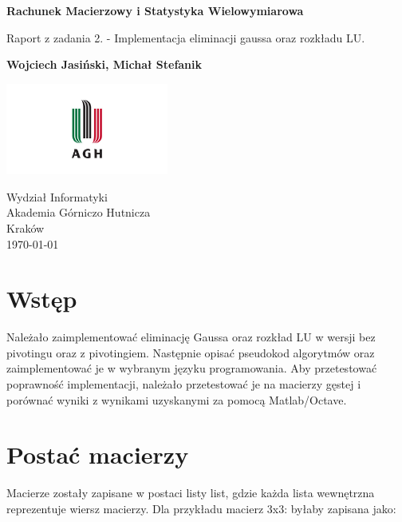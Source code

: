 \documentclass[a4paper]{article}
\begin{document}
\begin{titlepage}
    \begin{center}
        \vspace*{1cm}

        \Huge
        \textbf{Rachunek Macierzowy i Statystyka Wielowymiarowa}

        \Large
        \vspace{0.5cm}
        Raport z zadania 2. - Implementacja eliminacji gaussa oraz rozkładu LU.

        \vspace{1.5cm}

        \textbf{Wojciech Jasiński, Michał Stefanik}

        \vfill


        \vspace{0.8cm}

        \includegraphics[width=0.4\textwidth]{agh_logo.jpg}

        Wydział Informatyki\\
        Akademia Górniczo Hutnicza\\
        Kraków\\
        \today

    \end{center}
\end{titlepage}

\tableofcontents
\newpage




\section{Wstęp}
Należało zaimplementować eliminację Gaussa oraz rozkład LU w wersji bez pivotingu oraz z pivotingiem.
Następnie opisać pseudokod algorytmów oraz zaimplementować je w wybranym języku programowania.
Aby przetestować poprawność implementacji, należało przetestować je na macierzy gęstej i porównać wyniki z wynikami uzyskanymi za pomocą Matlab/Octave.

\section{Postać macierzy}
Macierze zostały zapisane w postaci listy list, gdzie każda lista wewnętrzna reprezentuje wiersz macierzy.
Dla przykładu macierz 3x3:
byłaby zapisana jako:
\end{document}
